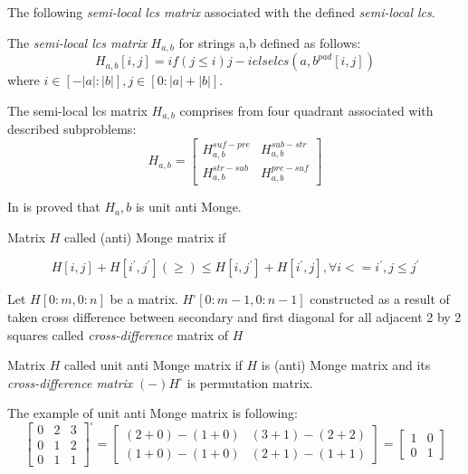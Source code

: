 The following \emph{semi-local lcs matrix} associated with the defined \emph{semi-local lcs}.
\begin{definition}
The \emph{semi-local lcs matrix}  $H_{a,b}$ for strings a,b defined as follows:
\begin{equation}
	H_{a,b}[i,j] = if (j\leq i) j-i  else lcs(a,b^{pad}[i,j]) 
\end{equation} 
where $i \in [-|a|:|b|], j \in [0:|a|+|b|] $.

The semi-local lcs matrix $H_{a,b}$ comprises from four
quadrant associated with described  subproblems:
\begin{equation}
 H_{a,b} = \begin{bmatrix}
H_{a,b}^{suf-pre} & H_{a,b}^{sub-str} \\
H_{a,b}^{str-sub} & H_{a,b}^{pre-suf} 
\end{bmatrix}    
\end{equation}

In \cite{tiskin} is proved that ${H_a,b}$ is unit anti Monge.
\begin{definition}
Matrix $H$ called (anti) Monge matrix if

\begin{displaymath}
H[i,j]+H[i^{'},j^{'}] (\geq)\leq H[i,j^{'}]+H[i^{'},j], \forall i<=i^{'}, j \leq j^{'}
\end{displaymath}
\end{definition}

\begin{definition}
Let $H[0:m,0:n]$  be a matrix.
$H^{\square}[0:m-1,0:n-1]$ constructed as a result of taken cross difference between secondary and first diagonal for all adjacent 2 by 2 squares called \emph{cross-difference} matrix of  $H$
\end{definition}


\begin{definition}
Matrix $H$ called unit anti Monge matrix if $H$ is (anti) Monge matrix and its \emph{cross-difference matrix} $(-)H^{\square}$ is permutation matrix.
\end{definition}
The example of unit anti Monge matrix is following:
\begin{equation}
\begin{bmatrix}
0 & 2 & 3 \\
0 & 1 & 2 \\
0 & 1 & 1
\end{bmatrix} ^ { \square} =
\begin{bmatrix}
(2 + 0) - (1 + 0)  & (3 + 1) - (2 + 2)  \\
(1 + 0) - (1 + 0) &  (2 + 1) - (1 + 1) 
\end{bmatrix} = 
\begin{bmatrix}
1 & 0  \\
0 & 1 
\end{bmatrix} 
\end{equation}
 



\end{definition}

